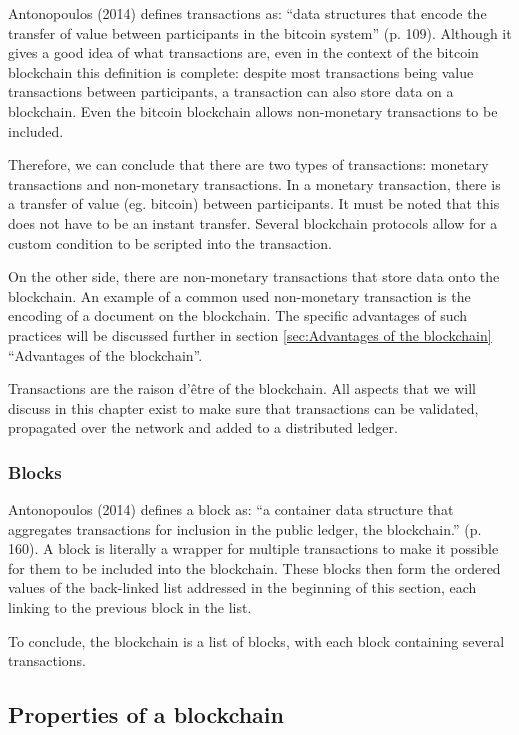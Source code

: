 Antonopoulos (2014) \cite{antonopoulos:2014} defines transactions as: ``data structures that encode the transfer of value between participants in the bitcoin system'' (p. 109). Although it gives a good idea of what transactions are, even in the context of the bitcoin blockchain this definition is complete: despite most transactions being value transactions between participants, a transaction can also store data on a blockchain. Even the bitcoin blockchain allows non-monetary transactions to be included.

Therefore, we can conclude that there are two types of transactions: monetary transactions and non-monetary transactions. In a monetary transaction, there is a transfer of value (eg. bitcoin) between participants. It must be noted that this does not have to be an instant transfer. Several blockchain protocols allow for a custom condition to be scripted into the transaction.

On the other side, there are non-monetary transactions that store data onto the blockchain. An example of a common used non-monetary transaction is the encoding of a document on the blockchain. The specific advantages of such practices will be discussed further in section \ref{sec:Advantages of the blockchain} ``Advantages of the blockchain''.

Transactions are the raison d'\^{e}tre of the blockchain. All aspects that we will discuss in this chapter exist to make sure that transactions can be validated, propagated over the network and added to a distributed ledger.

\subsubsection{Blocks}
\label{subsec:Blocks}

Antonopoulos (2014) \cite{antonopoulos:2014} defines a block as: ``a container data structure that aggregates transactions for inclusion in the public ledger, the blockchain.'' (p. 160). A block is literally a wrapper for multiple transactions to make it possible for them to be included into the blockchain. These blocks then form the ordered values of the back-linked list addressed in the beginning of this section, each linking to the previous block in the list.

To conclude, the blockchain is a list of blocks, with each block containing several transactions.

\subsection{Properties of a blockchain}


